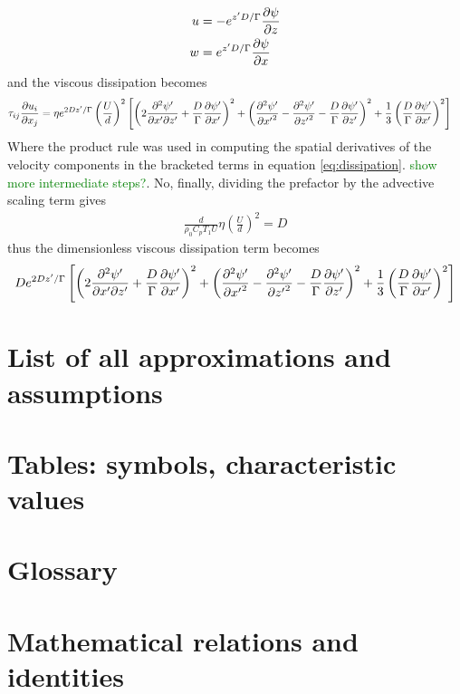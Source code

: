 \documentclass[a4paper]{article}
\begin{document}
\begin{mdframed}
    \begin{align*}
        u &= -e^{z'D/\Gamma}\pdv{\psi}{z} \\
        w &= e^{z'D/\Gamma}\pdv{\psi}{x}
    \end{align*}
    and the viscous dissipation becomes
    \begin{align*}
        \tau_{ij}\pdv{u_i}{x_j} &= \eta e^{2Dz'/\Gamma} \left(\frac{U}{d}\right)^2
  \left[
    \left( 2\pdv{\psi'}{x'}{z'} + \frac{D}{\Gamma}\pdv{\psi'}{x'} \right)^{2}
  + \left( \pdv[2]{\psi'}{{x'}} - \pdv[2]{\psi'}{{z'}} - \frac{D}{\Gamma}\pdv{\psi'}{z'} \right)^{2}
  + \frac{1}{3}\left( \frac{D}{\Gamma}\pdv{\psi'}{x'} \right)^{2}
  \right]
    \end{align*}
    Where the product rule was used in computing the spatial derivatives of the velocity components in the bracketed 
    terms in equation \eqref{eq:dissipation}. \textcolor{green}{show more intermediate steps?}. 
    No, finally, dividing the prefactor by the advective scaling term gives
    \begin{align*}
        \frac{d}{\rho_0C_p T_1 U} \eta \left(\frac{U}{d}\right)^2 = D
    \end{align*} 
    thus the dimensionless viscous dissipation term becomes 
    \begin{align*}
    De^{2Dz'/\Gamma} \left[
    \left( 2\pdv{\psi'}{x'}{z'} + \frac{D}{\Gamma}\pdv{\psi'}{x'} \right)^{2}
  + \left( \pdv[2]{\psi'}{{x'}} - \pdv[2]{\psi'}{{z'}} - \frac{D}{\Gamma}\pdv{\psi'}{z'} \right)^{2}
  + \frac{1}{3}\left( \frac{D}{\Gamma}\pdv{\psi'}{x'} \right)^{2}
  \right]
    \end{align*}
\end{mdframed}

\section{List of all approximations and assumptions}
\section{Tables: symbols, characteristic values}
\section{Glossary}

\section{Mathematical relations and identities} \label{section:math}
\end{document}
